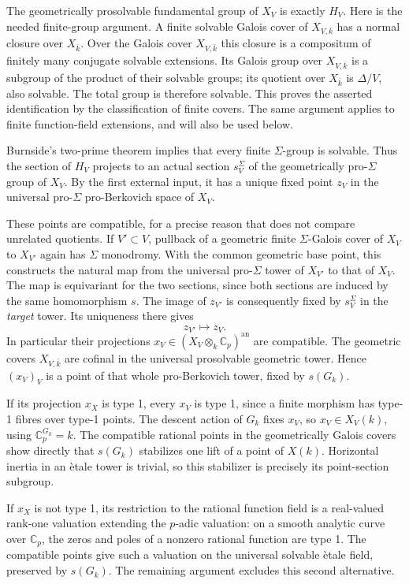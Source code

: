 The geometrically prosolvable fundamental group of $X_V$ is exactly
$H_V$.  Here is the needed finite-group argument.  A finite solvable
Galois cover of $X_{V,\bar k}$ has a normal closure over $X_{\bar k}$.
Over the Galois cover $X_{V,\bar k}$ this closure is a compositum of
finitely many conjugate solvable extensions.  Its Galois group over
$X_{V,\bar k}$ is a subgroup of the product of their solvable groups;
its quotient over $X_{\bar k}$ is $\Delta/V$, also solvable.  The total
group is therefore solvable.  This proves the asserted identification
by the classification of finite covers.  The same argument applies to
finite function-field extensions, and will also be used below.

Burnside's two-prime theorem implies that every finite $\Sigma$-group
is solvable.  Thus the section of $H_V$ projects to an actual section
$s_V^\Sigma$ of the geometrically pro-$\Sigma$ group of $X_V$.
By the first external input, it has a unique fixed point $z_V$ in
the universal pro-$\Sigma$ pro-Berkovich space of $X_V$.

These points are compatible, for a precise reason that does not
compare unrelated quotients.  If $V'\subset V$, pullback of a
geometric finite $\Sigma$-Galois cover of $X_V$ to $X_{V'}$ again has
$\Sigma$ monodromy.  With the common geometric base point, this
constructs the natural map from the universal pro-$\Sigma$ tower of
$X_{V'}$ to that of $X_V$.  The map is equivariant for the two sections,
since both sections are induced by the same homomorphism $s$.
The image of $z_{V'}$ is consequently fixed by $s_V^\Sigma$ in the
\emph{target} tower.  Its uniqueness there gives
\[
                         z_{V'}\longmapsto z_V.
\]
In particular their projections
$x_V\in (X_V\otimes_k\mathbb C_p)^{\mathrm{an}}$ are compatible.
The geometric covers $X_{V,\bar k}$ are cofinal in the universal
prosolvable geometric tower.  Hence $(x_V)_V$ is a point of that
whole pro-Berkovich tower, fixed by $s(G_k)$.

If its projection $x_X$ is type 1, every $x_V$ is type 1, since a
finite morphism has type-1 fibres over type-1 points.  The descent
action of $G_k$ fixes $x_V$, so $x_V\in X_V(k)$, using
$\mathbb C_p^{G_k}=k$.  The compatible rational points in the
geometrically Galois covers show directly that $s(G_k)$ stabilizes
one lift of a point of $X(k)$.  Horizontal inertia in an \`etale
tower is trivial, so this stabilizer is precisely its point-section
subgroup.

If $x_X$ is not type 1, its restriction to the rational function
field is a real-valued rank-one valuation extending the $p$-adic
valuation: on a smooth analytic curve over $\mathbb C_p$, the zeros
and poles of a nonzero rational function are type 1.  The compatible
points give such a valuation on the universal solvable \`etale
field, preserved by $s(G_k)$.  The remaining argument excludes this
second alternative.

